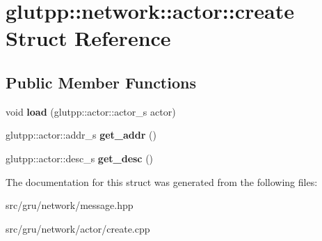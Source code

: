 \hypertarget{structglutpp_1_1network_1_1actor_1_1create}{\section{glutpp\-:\-:network\-:\-:actor\-:\-:create \-Struct \-Reference}
\label{structglutpp_1_1network_1_1actor_1_1create}
}
\subsection*{\-Public \-Member \-Functions}
\begin{DoxyCompactItemize}
\item 
\hypertarget{structglutpp_1_1network_1_1actor_1_1create_aea0003956e928ec83111fb120c54b53e}{void {\bfseries load} (glutpp\-::actor\-::actor\-\_\-s actor)}\label{structglutpp_1_1network_1_1actor_1_1create_aea0003956e928ec83111fb120c54b53e}

\item 
\hypertarget{structglutpp_1_1network_1_1actor_1_1create_a5e1ef23618f2897553f39c83ca5aa139}{glutpp\-::actor\-::addr\-\_\-s {\bfseries get\-\_\-addr} ()}\label{structglutpp_1_1network_1_1actor_1_1create_a5e1ef23618f2897553f39c83ca5aa139}

\item 
\hypertarget{structglutpp_1_1network_1_1actor_1_1create_a9eecf7aeb89c344c0a2807eda390b5de}{glutpp\-::actor\-::desc\-\_\-s {\bfseries get\-\_\-desc} ()}\label{structglutpp_1_1network_1_1actor_1_1create_a9eecf7aeb89c344c0a2807eda390b5de}

\end{DoxyCompactItemize}


\-The documentation for this struct was generated from the following files\-:\begin{DoxyCompactItemize}
\item 
src/gru/network/message.\-hpp\item 
src/gru/network/actor/create.\-cpp\end{DoxyCompactItemize}
